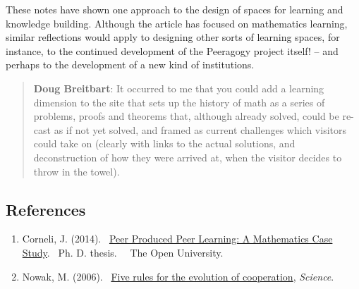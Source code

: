 These notes have shown one approach to the design of spaces for learning
and knowledge building. Although the article has focused on mathematics
learning, similar reflections would apply to designing other sorts of
learning spaces, for instance, to the continued development of the
Peeragogy project itself! -- and perhaps to the development of a new
kind of institutions.

\begin{quote}
\textbf{Doug Breitbart}: It occurred to me that you could add a learning
dimension to the site that sets up the history of math as a series of
problems, proofs and theorems that, although already solved, could be
re-cast as if not yet solved, and framed as current challenges which
visitors could take on (clearly with links to the actual solutions, and
deconstruction of how they were arrived at, when the visitor decides to
throw in the towel).
\end{quote}

\subsection{References}

\begin{enumerate}
\itemsep1pt\parskip0pt
\item
  Corneli, J. (2014).~
  \href{http://metameso.org/~joe/thesis-outline.html}{Peer Produced Peer
  Learning: A Mathematics Case Study}.~ Ph. D. thesis.~~ The
  Open University.
\item
  Nowak, M. (2006).~
  \href{http://www.sciencemag.org/content/314/5805/1560.full}{Five rules
  for the evolution of cooperation}, \emph{Science}.
\end{enumerate}
